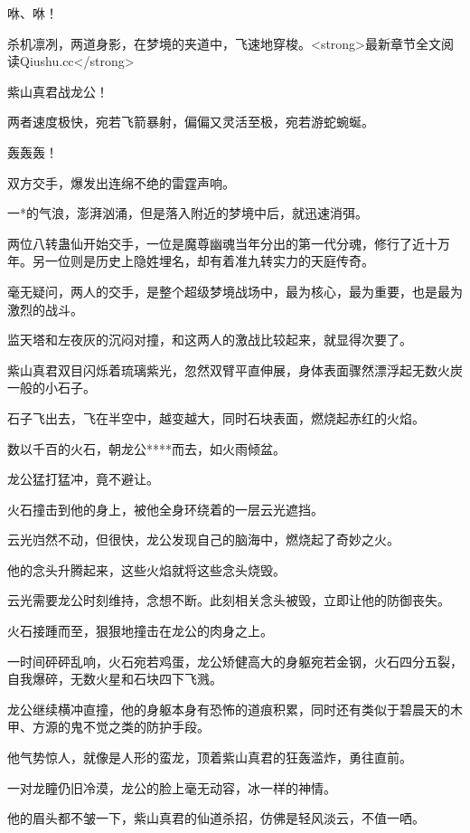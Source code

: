 
\begin{this_body}

咻、咻！

杀机凛冽，两道身影，在梦境的夹道中，飞速地穿梭。<strong>最新章节全文阅读Qiushu.cc</strong>

紫山真君战龙公！

两者速度极快，宛若飞箭暴射，偏偏又灵活至极，宛若游蛇蜿蜒。

轰轰轰！

双方交手，爆发出连绵不绝的雷霆声响。

一*的气浪，澎湃汹涌，但是落入附近的梦境中后，就迅速消弭。

两位八转蛊仙开始交手，一位是魔尊幽魂当年分出的第一代分魂，修行了近十万年。另一位则是历史上隐姓埋名，却有着准九转实力的天庭传奇。

毫无疑问，两人的交手，是整个超级梦境战场中，最为核心，最为重要，也是最为激烈的战斗。

监天塔和左夜灰的沉闷对撞，和这两人的激战比较起来，就显得次要了。

紫山真君双目闪烁着琉璃紫光，忽然双臂平直伸展，身体表面骤然漂浮起无数火炭一般的小石子。

石子飞出去，飞在半空中，越变越大，同时石块表面，燃烧起赤红的火焰。

数以千百的火石，朝龙公****而去，如火雨倾盆。

龙公猛打猛冲，竟不避让。

火石撞击到他的身上，被他全身环绕着的一层云光遮挡。

云光岿然不动，但很快，龙公发现自己的脑海中，燃烧起了奇妙之火。

他的念头升腾起来，这些火焰就将这些念头烧毁。

云光需要龙公时刻维持，念想不断。此刻相关念头被毁，立即让他的防御丧失。

火石接踵而至，狠狠地撞击在龙公的肉身之上。

一时间砰砰乱响，火石宛若鸡蛋，龙公矫健高大的身躯宛若金钢，火石四分五裂，自我爆碎，无数火星和石块四下飞溅。

龙公继续横冲直撞，他的身躯本身有恐怖的道痕积累，同时还有类似于碧晨天的木甲、方源的鬼不觉之类的防护手段。

他气势惊人，就像是人形的蛮龙，顶着紫山真君的狂轰滥炸，勇往直前。

一对龙瞳仍旧冷漠，龙公的脸上毫无动容，冰一样的神情。

他的眉头都不皱一下，紫山真君的仙道杀招，仿佛是轻风淡云，不值一哂。


\end{this_body}
